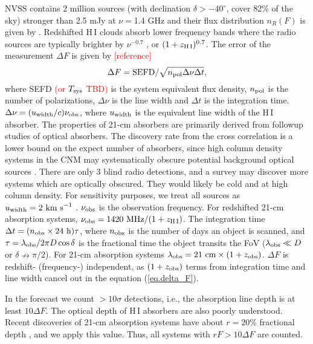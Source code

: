 \documentclass[]{raa}
\newcommand{\HI}{{H{\small\,I}}}
\newcommand{\tcr}{\textcolor{red}}
\begin{document}
NVSS contains 2 million sources (with declination $\delta >-40^\circ$,
cover 82\% of the sky) stronger than 2.5
mJy at $\nu=$1.4 GHz \citep{1998AJ....115.1693C} and their flux
distribution $n_R(F)$ is given by \cite{1984ApJ...287..461C}.
Redshifted {\HI} clouds absorb lower frequency bands where
the radio sources are typically brighter by $\nu^{-0.7}$
\citep{1998AJ....115.1693C}, or $(1+z_{\rm \HI})^{0.7}$.
The error of the measurement $\Delta F$ is given by \tcr{[reference]}
\begin{equation}\label{eq.delta_F}
    \Delta F={\rm SEFD}/\sqrt{n_{\rm pol}\Delta\nu\Delta t},
\end{equation}
where SEFD \tcr{(or $T_{\rm sys}$ TBD)} is the system equivalent flux density, $n_{\rm pol}$
is the number of polarizations, $\Delta\nu$ is the line width and
$\Delta t$ is the integration time. $\Delta\nu=(u_{\rm width}/c)\nu_{\rm obs}$,
where $u_{\rm width}$ is the equivalent line width of the {\HI}
absorber. The properties of 21-cm absorbers are primarily derived from
followup studies of optical absorbers. The discovery rate from the
cross correlation is a lower bound on the expect number of absorbers,
since high column density systems in the CNM may systematically
obscure potential background optical sources \citep{2014PhRvL.113d1303Y}. There are
only 3 blind radio detections, and a survey may discover more systems
which are optically obscured. They would likely be cold and at high
column density. For sensitivity purposes, we treat all sources as
$u_{\rm width}=2\ {\rm km\ s}^{-1}$
\citep{1982ApJ...259..495W,2005ARA&A..43..861W}.
$\nu_{\rm obs}$ is the observation frequency. For redshifted
21-cm absorption systems, $\nu_{\rm obs}=1420\ {\rm MHz}/(1+z_{\rm \HI})$.
The integration time $\Delta t=(n_{\rm obs}\times 24\ {\rm h})\tau$,
where $n_{\rm obs}$ is the number of days an object is scanned,
and $\tau=\lambda_{\rm obs}/2\pi D\cos\delta$ is the fractional time the object
transits the FoV ($\lambda_{\rm obs}\ll D$ or $\delta\nrightarrow\pi/2$).
For 21-cm absorption systems $\lambda_{\rm obs}=21\ {\rm cm}\times (1+z_{\rm obs})$.
$\Delta F$ is redshift- (frequency-) independent, as $(1+z_{\rm obs})$ terms
from integration time and line width cancel out
in the equation (\ref{eq.delta_F}).

In the forecast we count $>10\sigma$ detections, i.e., the absorption
line depth is at least $10\Delta F$. The optical depth of {\HI} absorbers
are also poorly understood. Recent discoveries of 21-cm absorption systems
have about $r=20\%$ fractional depth \citep{2015MNRAS.453.1249A,2015MNRAS.453.1268Z},
and we apply this value. Thus, all systems with $rF>10\Delta F$ are counted.
\end{document}
